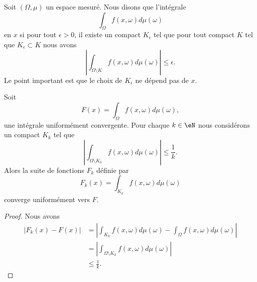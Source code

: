 \begin{definition}      \label{DEFooSHWAooWtswtp}
	Soit \( (\Omega,\mu)\) un espace mesuré. Nous disons que l'intégrale
	\begin{equation}
		\int_{\Omega}f(x,\omega)d\mu(\omega)
	\end{equation}
	 en \( x\) si pour tout \( \epsilon>0\), il existe un compact \( K_{\epsilon}\) tel que pour tout compact \( K\) tel que \( K_{\epsilon}\subset K\) nous avons
	\begin{equation}
		\left| \int_{\Omega\setminus K}f(x,\omega)d\mu(\omega) \right| \leq \epsilon.
	\end{equation}
	Le point important est que le choix de \( K_{\epsilon}\) ne dépend pas de \( x\).
\end{definition}

\begin{lemma}       \label{LemOgQdpJ}
	Soit
	\begin{equation}
		F(x)=\int_{\Omega}f(x,\omega)d\mu(\omega),
	\end{equation}
	une intégrale uniformément convergente. Pour chaque \( k\in \eN\) nous considérons un compact \( K_k\) tel que
	\begin{equation}
		\left| \int_{\Omega\setminus K_k}f(x,\omega)d\mu(\omega) \right| \leq\frac{1}{ k }.
	\end{equation}
	Alors la suite de fonctions \( F_k\) définie par
	\begin{equation}
		F_k(x)=\int_{K_k}f(x,\omega)d\mu(\omega)
	\end{equation}
	converge uniformément vers \( F\).
\end{lemma}

\begin{proof}
	Nous avons
	\begin{subequations}
		\begin{align}
			\big| F_k(x)-F(x) \big| & =\left| \int_{K_k}f(x,\omega)d\mu(\omega)-\int_{\Omega}f(x,\omega)d\mu(\omega) \right| \\
			                        & =| \int_{\Omega\setminus K_k}f(x,\omega)d\mu(\omega) |                                 \\
			                        & \leq \frac{1}{ k }.
		\end{align}
	\end{subequations}
\end{proof}

